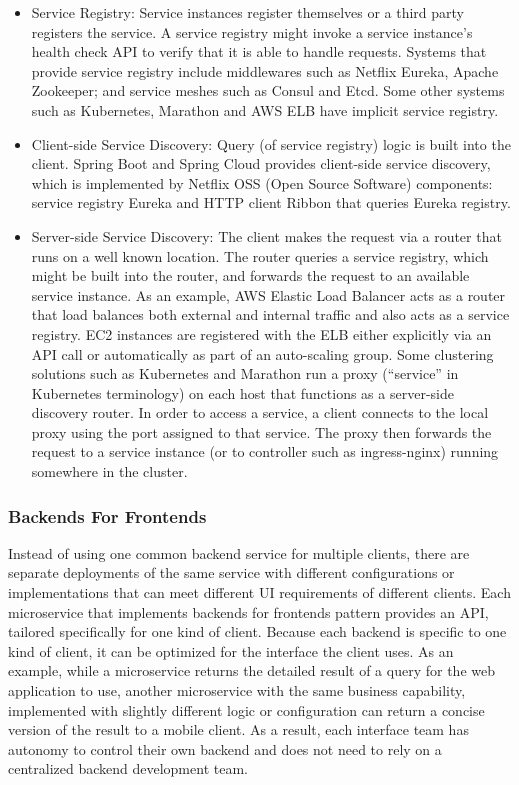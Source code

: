 \documentclass{Configuration_Files/PoliMi3i_thesis}
\begin{document}
\begin{itemize}
    \item Service Registry: Service instances register themselves or a third party registers the service.
    A service registry might invoke a service instance’s health check API to verify that it is able to handle requests. Systems that provide service registry include middlewares such as Netflix Eureka, Apache Zookeeper; and service meshes such as Consul and Etcd. Some other systems such as Kubernetes, Marathon and AWS ELB have implicit service registry.
    
    \item Client-side Service Discovery: Query (of service registry) logic is built into the client.
    Spring Boot and Spring Cloud provides client-side service discovery, which is implemented by Netflix OSS (Open Source Software) components: service registry Eureka and HTTP client Ribbon that queries Eureka registry.
    
    \item Server-side Service Discovery: The client makes the request via a router that runs on a well known location.
    The router queries a service registry, which might be built into the router, and forwards the request to an available service instance.
    As an example, AWS Elastic Load Balancer acts as a router that load balances both external and internal traffic and also acts as a service registry.
    EC2 instances are registered with the ELB either explicitly via an API call or automatically as part of an auto-scaling group.
    Some clustering solutions such as Kubernetes and Marathon run a proxy (“service” in Kubernetes terminology) on each host that functions as a server-side discovery router.
    In order to access a service, a client connects to the local proxy using the port assigned to that service.
    The proxy then forwards the request to a service instance (or to controller such as ingress-nginx) running somewhere in the cluster.

\end{itemize}

\subsubsection{Backends For Frontends}
\label{subsubsec:bff}

Instead of using one common backend service for multiple clients, there are separate deployments of the same service with different configurations or implementations that can meet different UI requirements of different clients.
Each microservice that implements backends for frontends pattern provides an API, tailored specifically for one kind of client.
Because each backend is specific to one kind of client, it can be optimized for the interface the client uses.
As an example, while a microservice returns the detailed result of a query for the web application to use, another microservice with the same business capability, implemented with slightly different logic or configuration can return a concise version of the result to a mobile client.
As a result, each interface team has autonomy to control their own backend and does not need to rely on a centralized backend development team.
\end{document}
